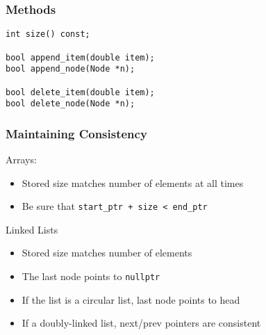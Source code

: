 \subsubsection{Methods}
\begin{lstlisting}[style=C++]
int size() const;

bool append_item(double item);
bool append_node(Node *n);

bool delete_item(double item);
bool delete_node(Node *n);
\end{lstlisting}

\subsubsection{Maintaining Consistency}
Arrays:
\begin{itemize}
	\item Stored size matches number of elements at all times
	\item Be sure that \lstinline[style=C++]{start_ptr + size < end_ptr}
\end{itemize}
Linked Lists
\begin{itemize}
	\item Stored size matches number of elements
	\item The last node points to \lstinline[style=C++]{nullptr}
	\item If the list is a circular list, last node points to head
	\item If a doubly-linked list, next/prev pointers are consistent
\end{itemize}